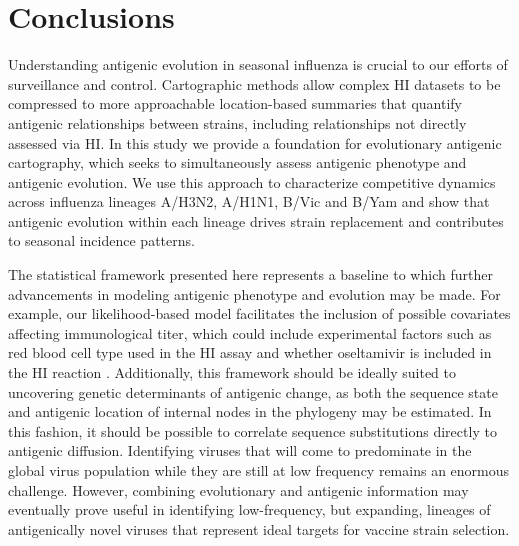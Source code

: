 \documentclass[11pt,oneside,letterpaper]{article}
\begin{document}
\section*{Conclusions}

Understanding antigenic evolution in seasonal influenza is crucial to our efforts of surveillance and control.
Cartographic methods allow complex HI datasets to be compressed to more approachable location-based summaries that quantify antigenic relationships between strains, including relationships not directly assessed via HI.
In this study we provide a foundation for evolutionary antigenic cartography, which seeks to simultaneously assess antigenic phenotype and antigenic evolution.
We use this approach to characterize competitive dynamics across influenza lineages A/H3N2, A/H1N1, B/Vic and B/Yam and show that antigenic evolution within each lineage drives strain replacement and contributes to seasonal incidence patterns.


The statistical framework presented here represents a baseline to which further advancements in modeling antigenic phenotype and evolution may be made.
For example, our likelihood-based model facilitates the inclusion of possible covariates affecting immunological titer, which could include experimental factors such as red blood cell type used in the HI assay \cite{Lin12} and whether oseltamivir is included in the HI reaction \cite{Lin10}.
Additionally, this framework should be ideally suited to uncovering genetic determinants of antigenic change, as both the sequence state and antigenic location of internal nodes in the phylogeny may be estimated.
In this fashion, it should be possible to correlate sequence substitutions directly to antigenic diffusion.
Identifying viruses that will come to predominate in the global virus population while they are still at low frequency remains an enormous challenge.
However, combining evolutionary and antigenic information may eventually prove useful in identifying low-frequency, but expanding, lineages of antigenically novel viruses that represent ideal targets for vaccine strain selection.
\end{document}
